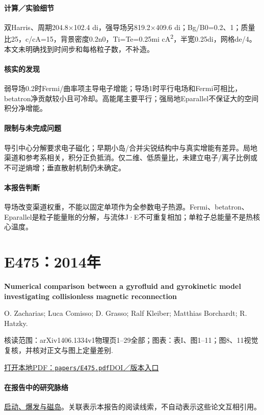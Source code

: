 \paragraph{计算／实验细节}双Harris、周期204.8×102.4 di，强导场另819.2×409.6 di；Bg/B0=0.2、1；质量比25，c/cA=15，背景密度0.2n0，Ti=Te=0.25mi cA\textsuperscript{2}，半宽0.25di，网格de/4。本文未明确找到时间步和每格粒子数，不补造。

\paragraph{核实的发现}弱导场0.2时Fermi/曲率项主导电子增能；导场1时平行电场和Fermi可相比，betatron净贡献较小且可冷却。高能尾主要平行；强局地Eparallel不保证大的空间积分净增能。

\paragraph{限制与未完成问题}导引中心分解要求电子磁化；早期小岛/合并尖锐结构中与真实增能有差异。局地渠道和参考系相关，积分正负抵消。仅二维、低质量比，未建立电子/离子比例或不可逆熵增；垂直散射机制仍未确定。

\paragraph{本报告判断}导场改变渠道权重，不能以固定单项作为全参数电子热源。Fermi、betatron、Eparallel是粒子能量账的分解，与流体J·E不可重复相加；单粒子总能量不是热核心温度。

\section{E475：2014年}\label{paper:E475}

\textbf{Numerical comparison between a gyrofluid and gyrokinetic model investigating collisionless magnetic reconnection}\citep{E475}\

O. Zacharias;  Luca Comisso;  D. Grasso;  Ralf Kleiber;  Matthias Borchardt;  R. Hatzky.

\textsf{核读范围：}arXiv1406.1334v1物理页1–29全部；\textsf{图表：}表I、图1–11；图8、11视觉复核，并核对正文与图上定量差别.

\href{run:papers/E475.pdf}{打开本地PDF：\texttt{papers/E475.pdf}}\quad\href{https://doi.org/10.1063/1.4882679}{DOI／版本入口}

\paragraph{在报告中的研究脉络}\hyperref[story:onset]{启动、爆发与磁岛}。关联表示本报告的阅读线索，不自动表示这些论文互相引用。

